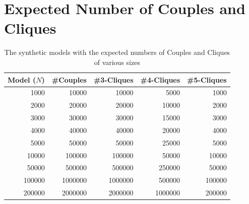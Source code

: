 \documentclass[a4paper,11pt]{article}
\begin{document}



\newpage
\appendix

\section{Expected Number of Couples and Cliques}
\label{sec:expected-numbers}

\begin{table}[!ht]
  \centering
  \begin{tabular}{| r | r | r | r | r |}
    \hline
    \textbf{Model (\(N\))} & \textbf{\#Couples} & \textbf{\#3-Cliques} & \textbf{\#4-Cliques} & \textbf{\#5-Cliques}\\
    \hline
    1000   & 10000   & 10000   & 5000    & 1000\\
    2000   & 20000   & 20000   & 10000   & 2000\\
    3000   & 30000   & 30000   & 15000   & 3000\\
    4000   & 40000   & 40000   & 20000   & 4000\\
    5000   & 50000   & 50000   & 25000   & 5000\\
    10000  & 100000  & 100000  & 50000   & 10000\\
    50000  & 500000  & 500000  & 250000  & 50000\\
    100000 & 1000000 & 1000000 & 500000  & 100000\\
    200000 & 2000000 & 2000000 & 1000000 & 200000\\
    \hline
\end{tabular}
\caption{The synthetic models with the expected numbers of Couples and Cliques of various sizes}
\label{tab:synthetic-numbers}
\end{table}
\end{document}

